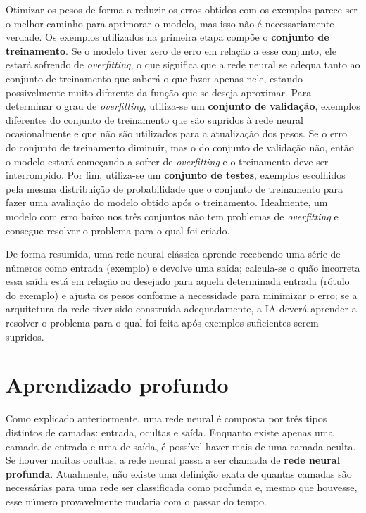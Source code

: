 Otimizar os pesos de forma a reduzir os erros obtidos com os exemplos parece ser o melhor caminho para aprimorar o modelo, mas isso não é necessariamente verdade.
Os exemplos utilizados na primeira etapa compõe o \textbf{conjunto de treinamento}.
Se o modelo tiver zero de erro em relação a esse conjunto, ele estará sofrendo de \textit{overfitting}, o que significa que a rede neural se adequa tanto ao conjunto de treinamento que saberá o que fazer apenas nele, estando possivelmente muito diferente da função que se deseja aproximar.
Para determinar o grau de \textit{overfitting}, utiliza-se um \textbf{conjunto de validação}, exemplos diferentes do conjunto de treinamento que são supridos à rede neural ocasionalmente e que não são utilizados para a atualização dos pesos.
Se o erro do conjunto de treinamento diminuir, mas o do conjunto de validação não, então o modelo estará começando a sofrer de \textit{overfitting} e o treinamento deve ser interrompido.
Por fim, utiliza-se um \textbf{conjunto de testes}, exemplos escolhidos pela mesma distribuição de probabilidade que o conjunto de treinamento para fazer uma avaliação do modelo obtido após o treinamento.
Idealmente, um modelo com erro baixo nos três conjuntos não tem problemas de \textit{overfitting} e consegue resolver o problema para o qual foi criado.

De forma resumida, uma rede neural clássica aprende recebendo uma série de números como entrada (exemplo) e devolve uma saída;
calcula-se o quão incorreta essa saída está em relação ao desejado para aquela determinada entrada (rótulo do exemplo) e ajusta os pesos conforme a necessidade para minimizar o erro;
se a arquitetura da rede tiver sido construída adequadamente, a IA deverá aprender a resolver o problema para o qual foi feita após exemplos suficientes serem supridos.


\section{Aprendizado profundo}
\label{sec:dl}

Como explicado anteriormente, uma rede neural é composta por três tipos distintos de camadas: entrada, ocultas e saída.
Enquanto existe apenas uma camada de entrada e uma de saída, é possível haver mais de uma camada oculta.
Se houver muitas ocultas, a rede neural passa a ser chamada de \textbf{rede neural profunda}.
Atualmente, não existe uma definição exata de quantas camadas são necessárias para uma rede ser classificada como profunda e, mesmo que houvesse, esse número provavelmente mudaria com o passar do tempo.

